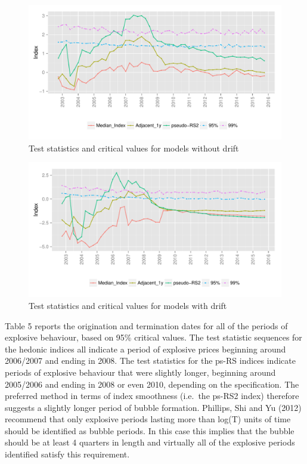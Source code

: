\documentclass[12pt,]{article}
\begin{document}
\begin{figure}[htbp]
\centering
\includegraphics{Art_Price_Indices_3_files/figure-latex/figure13-1.pdf}
\caption{Test statistics and critical values for models without drift}
\end{figure}

\begin{figure}[htbp]
\centering
\includegraphics{Art_Price_Indices_3_files/figure-latex/figure14-1.pdf}
\caption{Test statistics and critical values for models with drift}
\end{figure}

Table 5 reports the origination and termination dates for all of the
periods of explosive behaviour, based on 95\% critical values. The test
statistic sequences for the hedonic indices all indicate a period of
explosive prices beginning around 2006/2007 and ending in 2008. The test
statistics for the ps-RS indices indicate periods of explosive behaviour
that were slightly longer, beginning around 2005/2006 and ending in 2008
or even 2010, depending on the specification. The preferred method in
terms of index smoothness (i.e.~the ps-RS2 index) therefore suggests a
slightly longer period of bubble formation. Phillips, Shi and Yu (2012)
recommend that only explosive periods lasting more than log(T) units of
time should be identified as bubble periods. In this case this implies
that the bubble should be at least 4 quarters in length and virtually
all of the explosive periods identified satisfy this requirement.
\end{document}
